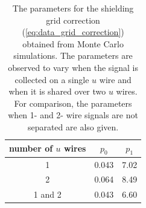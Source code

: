 \documentclass[herrin-thesis.tex]{subfiles}
\begin{document}
\begin{table}[hbtp]
\centering
\caption[Shielding grid correction parameters]{The parameters for the shielding grid correction (\cref{eq:data_grid_correction}) obtained from Monte Carlo simulations. The parameters are observed to vary when the signal is collected on a single \(u\) wire and when it is shared over two \(u\) wires. For comparison, the parameters when 1- and 2- wire signals are not separated are also given.}
\label{tab:data_grid_correction_parameters}
\begin{tabular}{c c c}\toprule
number of \(u\) wires	&	\(p_0\)	&	\(p_1\)	\\\midrule
1				&	0.043	&	7.02		\\
2				&	0.064	&	8.49		\\
1 and 2			&	0.043	&	6.60		\\\bottomrule
\end{tabular}
\end{table}
\end{document}
